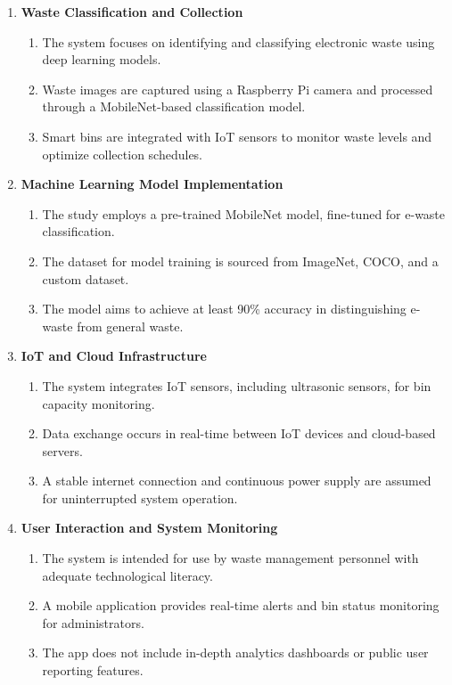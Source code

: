 \begin{enumerate}
    \item \textbf{Waste Classification and Collection}
    \begin{enumerate}
        \item The system focuses on identifying and classifying electronic waste using deep learning models.
        \item Waste images are captured using a Raspberry Pi camera and processed through a MobileNet-based classification model.
        \item Smart bins are integrated with IoT sensors to monitor waste levels and optimize collection schedules.
    \end{enumerate}
	
	\item \textbf{Machine Learning Model Implementation}
    \begin{enumerate}
        \item The study employs a pre-trained MobileNet model, fine-tuned for e-waste classification.
        \item The dataset for model training is sourced from ImageNet, COCO, and a custom dataset.
        \item The model aims to achieve at least 90\% accuracy in distinguishing e-waste from general waste.
    \end{enumerate}

    \item \textbf{IoT and Cloud Infrastructure}
    \begin{enumerate}
        \item The system integrates IoT sensors, including ultrasonic sensors, for bin capacity monitoring.
        \item Data exchange occurs in real-time between IoT devices and cloud-based servers.
        \item A stable internet connection and continuous power supply are assumed for uninterrupted system operation.
    \end{enumerate}

    \item \textbf{User Interaction and System Monitoring}
    \begin{enumerate}
        \item The system is intended for use by waste management personnel with adequate technological literacy.
        \item A mobile application provides real-time alerts and bin status monitoring for administrators.
        \item The app does not include in-depth analytics dashboards or public user reporting features.
    \end{enumerate}


\end{enumerate}
